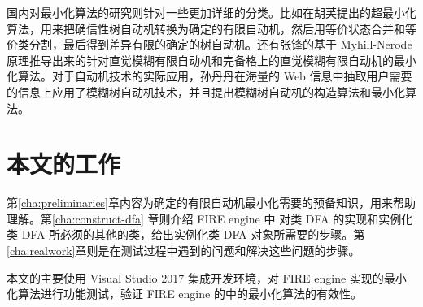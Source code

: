 国内对最小化算法的研究则针对一些更加详细的分类。比如在胡芙提出的超最小化算法，用来把确信性树自动机转换为确定的有限自动机，然后用等价状态合并和等价类分割，最后得到差异有限的确定的树自动机\cite{hfTreeFA}。还有张锋的基于 Myhill-Nerode 原理推导出来的针对直觉模糊有限自动机和完备格上的直觉模糊有限自动机的最小化算法\cite{zf14Min}。对于自动机技术的实际应用，孙丹丹在海量的 Web 信息中抽取用户需要的信息上应用了模糊树自动机技术，并且提出模糊树自动机的构造算法和最小化算法\cite{sdd14}。 

\section{本文的工作}

第\ref{cha:preliminaries}章内容为确定的有限自动机最小化需要的预备知识，用来帮助理解。第\ref{cha:construct-dfa} 章则介绍 FIRE engine 中 对类 DFA 的实现和实例化类 DFA 所必须的其他的类，给出实例化类 DFA 对象所需要的步骤。第\ref{cha:realwork}章则是在测试过程中遇到的问题和解决这些问题的步骤。

本文的主要使用 Visual Studio 2017 集成开发环境，对 FIRE engine 实现的最小化算法进行功能测试，验证 FIRE engine 的中的最小化算法的有效性。